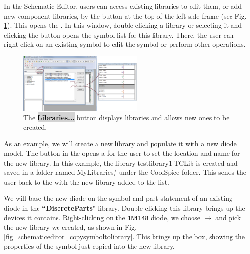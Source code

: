 In the Schematic Editor, users can access existing libraries to edit them, or add new component libraries, by the  button at the top of the left-side frame (see Fig. \ref{fig_schematiceditor_accessinglibraries}).  This opens the .  In this window, double-clicking a library or selecting it and clicking the  button opens the symbol list for this library.  There, the user can right-click on an existing symbol to edit the symbol or perform other operations.  

\begin{figure}[htb]
  \centering
    \includegraphics[width=0.55\textwidth]
		{./figures/getting_started_figures/SchematicEditor_openinglibraries.png}
    \caption{The \colorbox{lightgray}{\textcolor{black}{\textsf{\textbf{Libraries...}}}} button displays libraries and allows new ones to be created.}
  \label{fig_schematiceditor_accessinglibraries}
\end{figure} 

 As an example, we will create a new library and populate it with a new diode model.  The  button in the  opens a   for the user to set the location and name for the new library.  In this example, the library \textsf{testlibrary1.TCLib} is created and saved in a folder named \textsf{MyLibraries/} under the \textsf{CoolSpice} folder.   This sends the user back to the  with the new library added to the list.

We will base the new diode on the symbol and part statement of an existing diode in the \textbf{``DiscreteParts"} library. Double-clicking this library brings up the devices it contains.  Right-clicking on the \texttt{1N4148} diode, we choose $\to$ and pick the new library we created, as shown in Fig. \ref{fig_schematiceditor_copysymboltolibrary}.  This brings up the  box, showing the properties of the symbol just copied into the new library.

